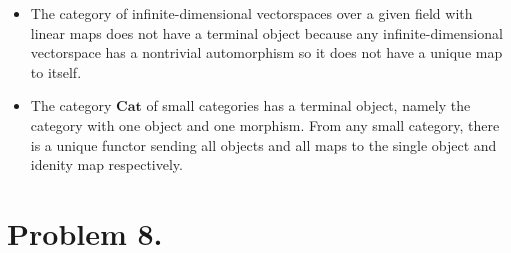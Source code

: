 \documentclass[12pt]{extarticle}
\begin{document}
\begin{enumerate}
\begin{itemize}
\item The category of infinite-dimensional vectorspaces over a given field with linear maps does not have a terminal object because any infinite-dimensional vectorspace has a nontrivial automorphism so it does not have a unique map to itself. 

\item The category $\mathbf{Cat}$ of small categories has a terminal object, namely the category with one object and one morphism. From any small category, there is a unique functor sending all objects and all maps to the single object and idenity map respectively.   

\end{itemize}

\end{enumerate}

\section*{Problem 8.}
\end{document}
